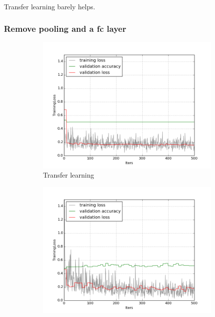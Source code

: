 \documentclass[a4paper,11pt]{article}
\begin{document}
Transfer learning barely helps. 
     
     
\subsubsection{Remove pooling and a fc layer}
\begin{figure}
    \centering
    \begin{minipage}[b]{\textwidth}
      \begin{subfigure}{.5\textwidth} 
        \centering
        \includegraphics[scale=0.4]{images/plot_soil_contam_noneC.png}
        \caption{Transfer learning}\label{fig:2a}
      \end{subfigure}%
      \begin{subfigure}{.5\textwidth} 
        \centering
        \includegraphics[scale=0.4]{images/plot_soil_contam_nopool_sl.png}

\end{subfigure}
\end{minipage}
\end{figure}
\end{document}
